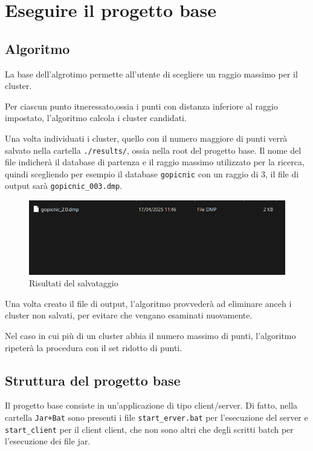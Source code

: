 \section{Eseguire il progetto base}

\subsection{Algoritmo}

La base dell'algrotimo permette all'utente di scegliere un raggio massimo per il cluster. 

Per ciascun punto itneressato,ossia i punti con distanza inferiore al raggio impostato, l'algoritmo calcola i cluster candidati.

Una volta individuati i cluster, quello con il numero maggiore di punti verrà salvato nella cartella \texttt{./results/}, ossia nella root del progetto base. Il nome del file indicherà il database di partenza e il raggio massimo utilizzato per la ricerca, quindi scegliendo per esempio il database \texttt{gopicnic} con un raggio di 3, il file di output sarà \texttt{gopicnic\_003.dmp}.

\begin{figure}[h!]
    \centering
    \includegraphics[width = 0.5 \textwidth]{images/results.png}
    \caption{Risultati del salvataggio}
    
\end{figure}

Una volta creato il file di output, l'algoritmo provvederà  ad eliminare anceh i cluster non salvati, per evitare che vengano esaminati nuovamente. 

Nel caso in cui più di un cluster abbia il numero massimo di punti, l'algoritmo ripeterà la procedura con il set ridotto di punti. 

\subsection{Struttura del progetto base}

Il progetto base consiste in un'applicazione di tipo client/server. Di fatto, nella cartella \texttt{Jar+Bat} sono presenti i file \texttt{start\_erver.bat} per l'esecuzione del server e \texttt{start\_client} per il client client, che non sono altri che degli scritti batch per l'esecuzione dei file jar.

